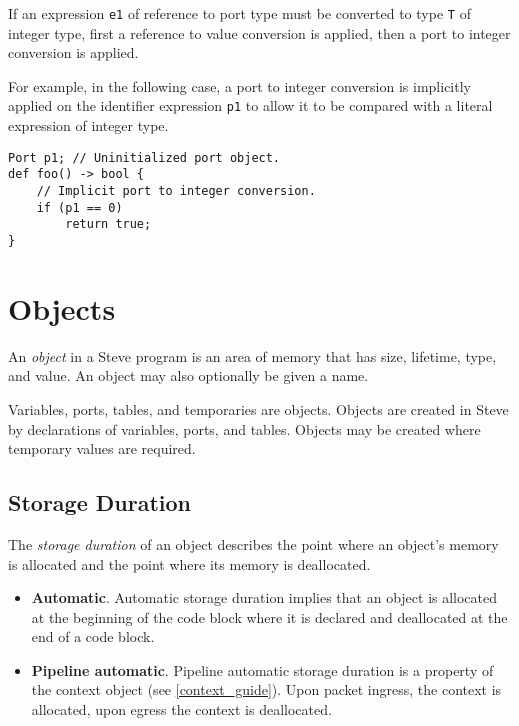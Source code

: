 If an expression \texttt{e1} of reference to port type must be converted to type \texttt{T} of integer type, first a reference to value conversion is applied, then a port to integer conversion is applied.

For example, in the following case, a port to integer conversion is implicitly applied on the identifier expression \texttt{p1} to allow it to be compared with a literal expression of integer type.

\noindent\begin{minipage}{\linewidth}
\begin{lstlisting}
Port p1; // Uninitialized port object.
def foo() -> bool {
	// Implicit port to integer conversion.
	if (p1 == 0)
		return true;
}
\end{lstlisting}
\end{minipage}

\section{Objects} \label{object_guide}

An \textit{object} in a Steve program is an area of memory that has size, lifetime, type, and value. An object may also optionally be given a name.

Variables, ports, tables, and temporaries are objects. Objects are created in Steve by declarations of variables, ports, and tables. Objects may be created where temporary values are required.

\subsection{Storage Duration} \label{storage_guide}

The \textit{storage duration} of an object describes the point where an object's memory is allocated and the point where its memory is deallocated.

\begin{itemize}
\item \textbf{Automatic}. Automatic storage duration implies that an object is allocated at the beginning of the code block where it is declared and deallocated at the end of a code block.
\item \textbf{Pipeline automatic}. Pipeline automatic storage duration is a property of the context object (see \ref{context_guide}). Upon packet ingress, the context is allocated, upon egress the context is deallocated.
\end{itemize}


